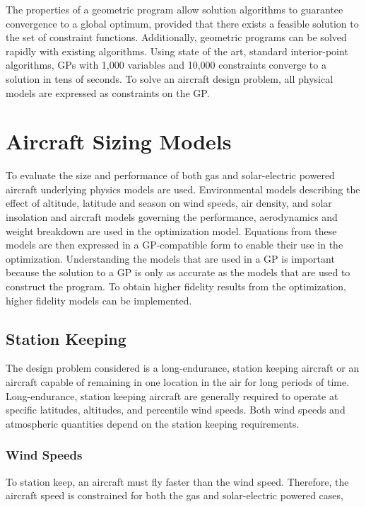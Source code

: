 \documentclass[]{aiaa-tc}%
\begin{document}
The properties of a geometric program allow solution algorithms to guarantee convergence to a global optimum, provided that there exists a feasible solution to the set of constraint functions.  
Additionally, geometric programs can be solved rapidly with existing algorithms.  
Using state of the art, standard interior-point algorithms, GPs with 1,000 variables and 10,000 constraints converge to a solution in tens of seconds.\cite{gp}  
To solve an aircraft design problem, all physical models are expressed as constraints on the GP.\cite{hoburgthesis} \\

\section{Aircraft Sizing Models}

To evaluate the size and performance of both gas and solar-electric powered aircraft underlying physics models are used.  
Environmental models describing the effect of altitude, latitude and season on wind speeds, air density, and solar insolation and aircraft models governing the performance, aerodynamics and weight breakdown are used in the optimization model.
Equations from these models are then expressed in a GP-compatible form to enable their use in the optimization. 
Understanding the models that are used in a GP is important because the solution to a GP is only as accurate as the models that are used to construct the program.  
To obtain higher fidelity results from the optimization, higher fidelity models can be implemented. 

\subsection{Station Keeping} 

The design problem considered is a long-endurance, station keeping aircraft or an aircraft capable of remaining in one location in the air for long periods of time. 
Long-endurance, station keeping aircraft are generally required to operate at specific latitudes, altitudes, and percentile wind speeds.\cite{zephyr} 
Both wind speeds and atmospheric quantities depend on the station keeping requirements. 

\subsubsection{Wind Speeds}

To station keep, an aircraft must fly faster than the wind speed.  
Therefore, the aircraft speed is constrained for both the gas and solar-electric powered cases,
\end{document}
